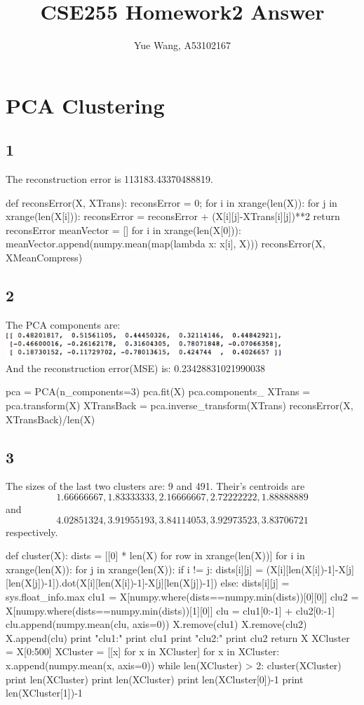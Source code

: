 \documentclass [11pt, a4paper, oneside] {article}
\author {Yue Wang, A53102167}
\title {CSE255 Homework2 Answer}
\begin{document}
\maketitle
\section *{PCA Clustering}
\subsection *{1}
The reconstruction error is 113183.43370488819.
\begin{python}
def reconsError(X, XTrans):
    reconsError = 0;
    for i in xrange(len(X)):
        for j in xrange(len(X[i])):
            reconsError = reconsError + (X[i][j]-XTrans[i][j])**2
    return reconsError
meanVector = []
for i in xrange(len(X[0])):
    meanVector.append(numpy.mean(map(lambda x: x[i], X)))
reconsError(X, XMeanCompress)
\end{python}
\subsection *{2}
The PCA components are:\\
\includegraphics[height=1cm]{pca.png}\\
And the reconstruction error(MSE) is: 0.23428831021990038\\
\begin{python}
pca = PCA(n_components=3)
pca.fit(X)
pca.components_
XTrans = pca.transform(X)
XTransBack = pca.inverse_transform(XTrans)
reconsError(X, XTransBack)/len(X)
\end{python}
\subsection *{3}
The sizes of the last two clusters are: 9 and 491. Their's centroids are \[1.66666667,  1.83333333,  2.16666667,  2.72222222,  1.88888889\] and  \[4.02851324,  3.91955193,  3.84114053,  3.92973523,  3.83706721\] respectively.
\begin{python}
def cluster(X):
    dists = [[0] * len(X) for row in xrange(len(X))]
    for i in xrange(len(X)):
        for j in xrange(len(X)):
            if i != j:
                dists[i][j] = (X[i][len(X[i])-1]-X[j][len(X[j])-1]).dot(X[i][len(X[i])-1]-X[j][len(X[j])-1])
            else:
                dists[i][j] = sys.float_info.max
    clu1 = X[numpy.where(dists==numpy.min(dists))[0][0]]
    clu2 = X[numpy.where(dists==numpy.min(dists))[1][0]]
    clu = clu1[0:-1] + clu2[0:-1]
    clu.append(numpy.mean(clu, axis=0))
    X.remove(clu1)
    X.remove(clu2)
    X.append(clu)
    print "clu1:"
    print clu1
    print "clu2:"
    print clu2
    return X
XCluster = X[0:500]
XCluster = [[x] for x in XCluster]
for x in XCluster:
    x.append(numpy.mean(x, axis=0))
while len(XCluster) > 2:
    cluster(XCluster)
    print len(XCluster)
print len(XCluster)
print len(XCluster[0])-1
print len(XCluster[1])-1
\end{python}
\end{document}
